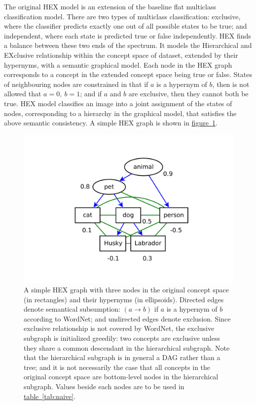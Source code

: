 \documentclass[11pt,a4paper]{article}
\begin{document}
The original HEX model \cite{deng2014large} is an extension of the baseline flat multiclass classification model. There are two types of multiclass classification: exclusive, where the classifier predicts exactly one out of all possible states to be true; and independent, where each state is predicted true or false independently. HEX finds a balance between these two ends of the spectrum. It models the Hierarchical and EXclusive relationship within the concept space of dataset, extended by their hypernyms, with a semantic graphical model. Each node in the HEX graph corresponds to a concept in the extended concept space being true or false. States of neighbouring nodes are constrained in that if $a$ is a hypernym of $b$, then is not allowed that $a=0,\ b=1$; and if $a$ and $b$ are exclusive, then they cannot both be true. HEX model classifies an image into a joint assignment of the states of nodes, corresponding to a hierarchy in the graphical model, that satisfies the above semantic consistency. A simple HEX graph is shown in \hyperref[fig:naive]{figure~\ref{fig:naive}}.
\begin{figure}[htbp]
\centering
\includegraphics[scale=0.5]{naive.pdf}
\caption{A simple HEX graph with three nodes in the original concept space (in rectangles) and their hypernyms (in ellipsoids). Directed edges denote semantical subsumption: $(a\rightarrow b)$ if $a$ is a hypernym of $b$ according to WordNet; and undirected edges denote exclusion. Since exclusive relationship is not covered by WordNet, the exclusive subgraph is initialized greedily: two concepts are exclusive unless they share a common descendant in the hierarchical subgraph. Note that the hierarchical subgraph is in general a DAG rather than a tree; and it is not necessarily the case that all concepts in the original concept space are bottom-level nodes in the hierarchical subgraph. Values beside each nodes are to be used in \hyperref[tab:naive]{table~\ref{tab:naive}}.}
\label{fig:naive}
\end{figure}
\end{document}
